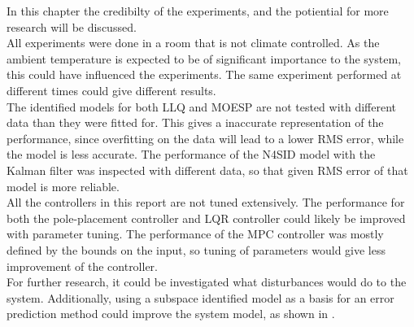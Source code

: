 In this chapter the credibilty of the experiments, and the potiential for more research will be discussed.\\
All experiments were done in a room that is not climate controlled. As the ambient temperature is expected to be of significant importance to the system, this could have influenced the experiments. The same experiment performed at different times could give different results.\\
The identified models for both LLQ and MOESP are not tested with different data than they were fitted for. This gives a inaccurate representation of the performance, since overfitting on the data will lead to a lower RMS error, while the model is less accurate. The performance of the N4SID model with the Kalman filter was inspected with different data, so that given RMS error of that model is more reliable.\\
All the controllers in this report are not tuned extensively. The performance for both the pole-placement controller and LQR controller could likely be improved with parameter tuning. The performance of the MPC controller was mostly defined by the bounds on the input, so tuning of parameters would give less improvement of the controller.\\

For further research, it could be investigated what disturbances would do to the system. Additionally, using a subspace identified model as a basis for an error prediction method could improve the system model, as shown in \cite{1184569}.